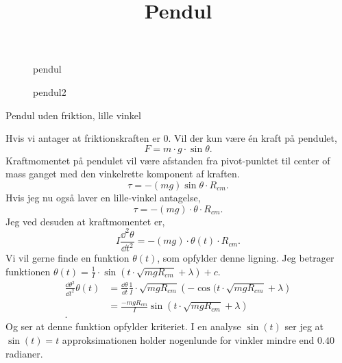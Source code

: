 
\title{\vspace{-1cm}Pendul\vspace{-1cm}}
\author{}
\date{}

\usepackage{multicol}

\maketitle
\thispagestyle{fancy}
\begin{figure}[ht]
    \centering
    \caption{pendul}
    \label{fig:pendul}
\end{figure}
\begin{figure}[ht]
    \centering
    \caption{pendul2}
    \label{fig:pendul2}
\end{figure}
\begin{subexercise}{Pendul uden friktion, lille vinkel}

\end{subexercise}
\begin{solution}
Hvis vi antager at friktionskraften er $0$. Vil der kun være én kraft på pendulet,
 \[
F = m\cdot g\cdot \sin \theta
.\]
Kraftmomentet på pendulet vil være afstanden fra pivot-punktet til center of mass ganget med den vinkelrette komponent af kraften. 
\[
	\tau = -(mg)\sin \theta \cdot R_{cm}
.\] 
Hvis jeg nu også laver en lille-vinkel antagelse,
\[
	\tau = -(mg) \cdot \theta \cdot R_{cm}
.\]
Jeg ved desuden at kraftmomentet er,
\[
	I \frac{\dd^2 \theta}{\dd t^2} = -(mg)\cdot \theta(t)\cdot  R_{cm}
.\] 
 Vi vil gerne finde en funktion $\theta(t)$, som opfylder denne ligning. Jeg betrager funktionen $\theta (t) = \frac{1}{I}\cdot \sin(t\cdot \sqrt{mgR_{cm}}+\lambda )+c$.
\begin{align*}
	\frac{\dd \theta^2}{\dd t^2} \theta (t) &= \frac{\dd \theta}{\dd t}\frac{1}{I}\cdot \sqrt{mgR_{cm}}\left( -\cos(t\cdot \sqrt{mgR_{cm}} +\lambda \right)  \\
						&= \frac{-mgR_{cm}}{I}\sin(t\cdot \sqrt{mgR_{cm}} +\lambda) \\
.\end{align*}
Og ser at denne funktion opfylder kriteriet. I en analyse $\sin(t)$ ser jeg at $\sin(t) = t$ approksimationen holder nogenlunde for vinkler mindre end $0.40$ radianer.
\end{solution}

